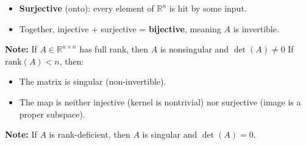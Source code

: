 \documentclass{report}
\begin{document}
\begin{itemize}
\begin{itemize}
\begin{itemize}
                        \item \textbf{Surjective} (onto): every element of $\mathbb{R}^n$ is hit by some input.
                        \item Together, injective + surjective = \textbf{bijective}, meaning $A$ is invertible.
                    \end{itemize}
            \end{itemize}
            \bigbreak \noindent 
            \textbf{Note:} If $A \in \mathbb{R}^{n\times n}$ has full rank, then $A$ is nonsingular and $\det(A) \ne 0$
            \bigbreak \noindent 
            If $\text{rank}(A) < n$, then:
            \begin{itemize}
                \item The matrix is singular (non-invertible).
                \item The map is neither injective (kernel is nontrivial) nor surjective (image is a proper subspace).
            \end{itemize}
            \bigbreak \noindent 
            \textbf{Note:} If $A$ is rank-deficient, then $A$ is singular and $\det(A) = 0$.


\end{itemize}
\end{document}
